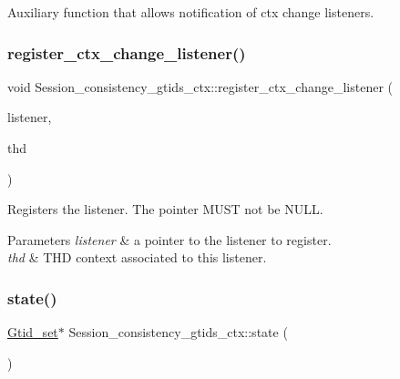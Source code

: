 Auxiliary function that allows notification of ctx change listeners. \mbox{\label{classSession__consistency__gtids__ctx_ae8438d9a17c106351e9e7f09f11d6840}} 
\subsubsection{\texorpdfstring{register\+\_\+ctx\+\_\+change\+\_\+listener()}{register\_ctx\_change\_listener()}}
{\footnotesize\ttfamily void Session\+\_\+consistency\+\_\+gtids\+\_\+ctx\+::register\+\_\+ctx\+\_\+change\+\_\+listener (\begin{DoxyParamCaption}\item[{\mbox{\hyperlink{classSession__consistency__gtids__ctx_1_1Ctx__change__listener}{Session\+\_\+consistency\+\_\+gtids\+\_\+ctx\+::\+Ctx\+\_\+change\+\_\+listener}} $\ast$}]{listener,  }\item[{T\+HD $\ast$}]{thd }\end{DoxyParamCaption})}

Registers the listener. The pointer M\+U\+ST not be N\+U\+LL.


\begin{DoxyParams}{Parameters}
{\em listener} & a pointer to the listener to register. \\
\hline
{\em thd} & T\+HD context associated to this listener. \\
\hline
\end{DoxyParams}
\mbox{\label{classSession__consistency__gtids__ctx_a2eaa91e30628e35da510f820e64d3e06}} 
\subsubsection{\texorpdfstring{state()}{state()}}
{\footnotesize\ttfamily \mbox{\hyperlink{classGtid__set}{Gtid\+\_\+set}}$\ast$ Session\+\_\+consistency\+\_\+gtids\+\_\+ctx\+::state (\begin{DoxyParamCaption}{ }\end{DoxyParamCaption})\hspace{0.3cm}{\ttfamily [inline]}}

